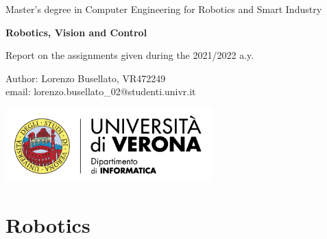 \documentclass{report}
\theoremstyle{break}
\numberwithin{equation}{section}
\newcommand\blankpage{%
    \null
    \thispagestyle{empty}%
    \addtocounter{page}{-1}%
    \newpage}
\begin{document}
\afterpage{\blankpage}
\begin{titlepage}
\begin{center}
\huge Master's degree in Computer Engineering for Robotics and Smart Industry
\end{center}
\vspace*{\fill}
\begin{center}
\textbf{\Huge Robotics, Vision and Control}
\end{center}
\begin{center}
Report on the assignments given during the 2021/2022 a.y.
\end{center}
\vspace*{\fill}
\begin{center}
\begin{minipage}{0.4\textwidth}
\begin{flushleft}
Author: Lorenzo Busellato, VR472249\\
email: lorenzo.busellato\_02@studenti.univr.it
\end{flushleft}
\end{minipage}
\begin{minipage}{0.5\textwidth}
\begin{flushright}
\includegraphics[keepaspectratio,width=0.6\textwidth]{logo}
\end{flushright}
\end{minipage}

\end{center}
\vspace{1cm}
\end{titlepage}


\afterpage{\blankpage}
\thispagestyle{empty}
\setcounter{page}{0}
\renewcommand{\cftsecleader}{\cftdotfill{\cftdotsep}}
\setcounter{tocdepth}{2}
\tableofcontents
\clearpage

\fancyhead[R]{}
\fancyhead[L]{}
\pagestyle{fancy}

\chapter{Robotics}


\end{document}
